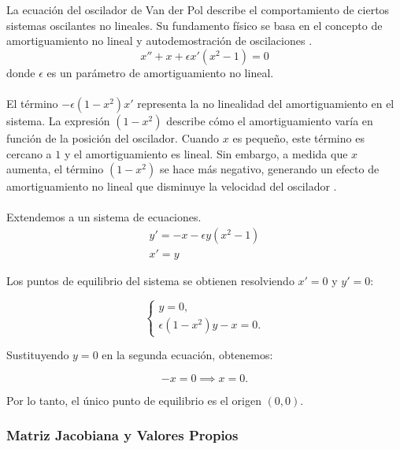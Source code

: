 La ecuación del oscilador de Van der Pol describe el comportamiento de ciertos sistemas oscilantes no lineales.
Su fundamento físico se basa en el concepto de amortiguamiento no lineal y autodemostración de oscilaciones \cite{vanderpol1926forced}.
\begin{equation}\label{eq: VP}
	x''+x+\epsilon x'(x^2-1)=0
\end{equation}
donde $\epsilon$ es un parámetro de amortiguamiento no lineal.\\
\\El término $-\epsilon(1 - x^2)x'$ representa la no linealidad del amortiguamiento en el sistema. La expresión
$(1 - x^2)$ describe cómo el amortiguamiento varía en función de la posición del oscilador. Cuando $x$ es
pequeño, este término es cercano a $1$ y el amortiguamiento es lineal. Sin embargo, a medida que $x$
aumenta, el término $(1 - x^2)$ se hace más negativo, generando un efecto de amortiguamiento no lineal que
disminuye la velocidad del oscilador \cite{strogatz2018nonlinear}.\\
\\Extendemos a un sistema de ecuaciones.
\begin{equation}\label{eq: VPsis}
	\begin{matrix}
		y'=-x-\epsilon y(x^2-1) \\
		x'=y
	\end{matrix}
\end{equation}

Los puntos de equilibrio del sistema se obtienen resolviendo \(x' = 0\) y \(y' = 0\):

\begin{equation}
    \begin{cases}
        y = 0, \\
        \epsilon (1 - x^2) y - x = 0.
    \end{cases}
\end{equation}

Sustituyendo \( y = 0 \) en la segunda ecuación, obtenemos:

\begin{equation}
    -x = 0 \implies x = 0.
\end{equation}

Por lo tanto, el único punto de equilibrio es el origen \((0, 0)\).

\subsubsection*{Matriz Jacobiana y Valores Propios}

